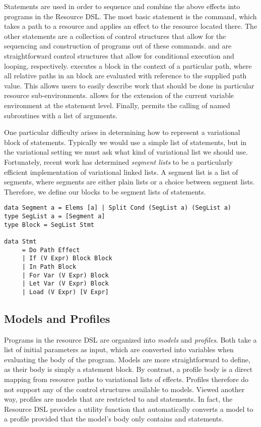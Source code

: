 \documentclass[12pt,oneside]{book}
\begin{document}
Statements are used in order to sequence and combine the above effects into programs in the Resource DSL.
The most basic statement is the  command, which takes a path to a resource and applies an effect to the resource located there.
The other statements are a collection of control structures that allow for the sequencing and construction of
programs out of these  commands.  and  are straightforward control structures that allow
for conditional execution and looping, respectively.  executes a block in the context of a particular path, where all
relative paths in an  block are evaluated with reference to the supplied path value. This allows
users to easily describe work that should be done in particular resource sub-environments.  allows for the
extension of the current variable environment at the statement level. Finally,  permits the calling of named
subroutines with a list of arguments. 

One particular difficulty arises in determining how to represent a variational block of statements. Typically we
would use a simple list of statements, but in the variational setting we must ask what kind of variational list
we should use. Fortunately, recent work \cite{lists} has determined \emph{segment lists} to be a particularly
efficient implementation of variational linked lists. A segment list is a list of segments, where segments are either
plain lists or a choice between segment lists. Therefore, we define our blocks to be segment lists of
statements.

\begin{minipage}{\linewidth}
\begin{lstlisting}
data Segment a = Elems [a] | Split Cond (SegList a) (SegList a)
type SegList a = [Segment a]
type Block = SegList Stmt

data Stmt
     = Do Path Effect
     | If (V Expr) Block Block
     | In Path Block
     | For Var (V Expr) Block
     | Let Var (V Expr) Block
     | Load (V Expr) [V Expr]
\end{lstlisting}
\end{minipage}

\subsection{Models and Profiles}

Programs in the resource DSL are organized into \emph{models} and \emph{profiles}. Both take a list of
initial parameters as input, which are converted into variables when evaluating the body of the program. Models are more straightforward to define,
as their body is simply a statement block. By contrast, a profile body is a direct mapping from resource paths to variational lists of effects. Profiles
therefore do not support any of the control structures available to models. Viewed another way, profiles are models that are restricted to 
and  statements. In fact, the Resource DSL provides a utility function  that automatically converts a model to a profile provided
that the model's body only contains  and  statements.
\end{document}
